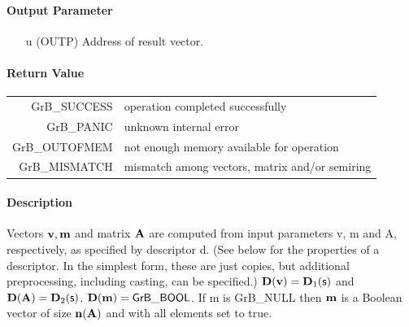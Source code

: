 \documentclass[11pt]{extarticle}
\begin{document}

\paragraph{Output Parameter}

\begin{itemize}
	\item[{\sf u}] ({\sf OUTP}) Address of result vector.
\end{itemize}

\paragraph{Return Value}


\begin{tabular}{rl} 
{\sf GrB\_SUCCESS} 	& operation completed successfully \\
{\sf GrB\_PANIC}	& unknown internal error \\
{\sf GrB\_OUTOFMEM}	& not enough memory available for operation \\
{\sf GrB\_MISMATCH}	& mismatch among vectors, matrix and/or semiring
\end{tabular}


\paragraph{Description}

Vectors ${\bf v}, {\bf m}$ and matrix ${\bf A}$ are computed from
input parameters {\sf v}, {\sf m} and {\sf A}, respectively, as specified
by descriptor {\sf d}. (See below for the properties of a descriptor. In
the simplest form, these are just copies, but additional preprocessing,
including casting, can be specified.)  $\bold{D}({\bf v}) =
\bold{D}_1({\sf s})$ and $\bold{D}({\bf A}) = \bold{D}_2({\sf s})$.
$\bold{D}({\bf m}) = {\sf GrB\_BOOL}$.  If {\sf m} is {\sf GrB\_NULL}
then ${\bf m}$ is a Boolean vector of size $\bold{n}({\bf A})$
and with all elements set to {\sf true}.
\end{document}
